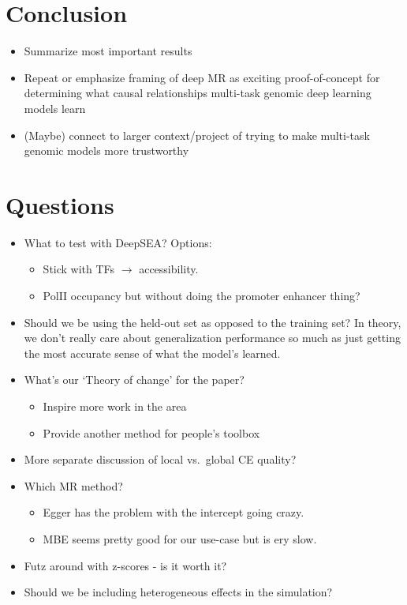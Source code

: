 \documentclass[twoside,11pt]{article}
\begin{document}
\section{Conclusion}%
\label{sec:conclusion}
\begin{itemize}
	\item Summarize most important results
	\item Repeat or emphasize framing of deep MR as exciting proof-of-concept for determining what causal relationships multi-task genomic deep learning models learn
	\item (Maybe) connect to larger context/project of trying to make multi-task genomic models more trustworthy
\end{itemize}

\pagebreak
\section{Questions}
\begin{itemize}
	\item What to test with DeepSEA? Options:
	\begin{itemize}
		\item Stick with TFs \( \rightarrow \) accessibility.
		\item PolII occupancy but without doing the promoter enhancer thing?
	\end{itemize}
	\item Should we be using the held-out set as opposed to the training set? In theory, we don't really care about generalization performance so much as just getting the most accurate sense of what the model's learned.
	\item What's our `Theory of change' for the paper?
	\begin{itemize}
		\item Inspire more work in the area
		\item Provide another method for people's toolbox
	\end{itemize}
	\item More separate discussion of local vs.\ global CE quality?
	\item Which MR method?
	\begin{itemize}
		\item Egger has the problem with the intercept going crazy.
		\item MBE seems pretty good for our use-case but is ery slow.
	\end{itemize}
	\item Futz around with z-scores - is it worth it? 
	\item Should we be including heterogeneous effects in the simulation?
\end{itemize}



\newpage

\appendix

\vskip 0.2in

\end{document}
